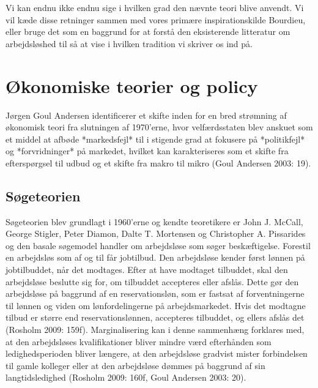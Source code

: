 Vi kan endnu ikke endnu sige i hvilken grad den nævnte teori blive anvendt. Vi vil kæde disse retninger sammen med vores primære inspirationskilde Bourdieu, eller bruge det som en baggrund for at forstå den eksisterende litteratur om arbejdsløshed til så at vise i hvilken tradition vi skriver os ind på.




\section{Økonomiske teorier og policy \label{}}

Jørgen Goul Andersen identificerer et skifte inden for en bred strømning af økonomisk teori fra slutningen af 1970'erne, hvor velfærdsstaten blev anskuet som et middel at afbøde *markedsfejl* til i stigende grad at fokusere på *politikfejl* og *forvridninger* på markedet, hvilket kan karakteriseres som et skifte fra efterspørgsel til udbud og et skifte fra makro til mikro (Goul Andersen 2003: 19).

\subsection{Søgeteorien \label{}}
Søgeteorien blev grundlagt i 1960'erne og kendte teoretikere er John J. McCall, George Stigler, Peter Diamon, Dalte T. Mortensen og Christopher A. Pissarides og den basale søgemodel handler om arbejdsløse som søger beskæftigelse. Forestil en arbejdsløs som af og til får jobtilbud. Den arbejdsløse kender først lønnen på jobtilbuddet, når det modtages. Efter at have modtaget tilbuddet, skal den arbejdsløse beslutte sig for, om tilbuddet accepteres eller afslås. Dette gør den arbejdsløse på baggrund af en reservationsløn, som er fastsat af forventningerne til lønnen og viden om lønfordelingerne på arbejdsmarkedet. Hvis det modtagne tilbud er større end reservationslønnen, accepteres tilbuddet, og ellers afslås det (Rosholm 2009: 159f). Marginalisering kan i denne sammenhæng forklares med, at den arbejdsløses kvalifikationer bliver mindre værd efterhånden som ledighedsperioden bliver længere, at den arbejdsløse gradvist mister forbindelsen til gamle kolleger eller at den arbejdsløse dømmes på baggrund af sin langtidsledighed (Rosholm 2009: 160f, Goul Andersen 2003: 20).

